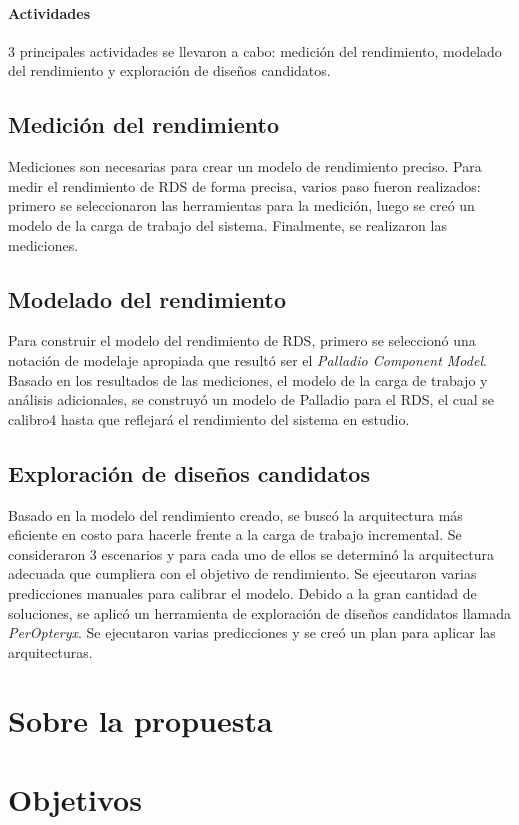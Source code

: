 \paragraph{Actividades} 3 principales actividades se llevaron a cabo: medición del rendimiento, modelado del rendimiento y exploración de diseños candidatos.

\subsection{Medición del rendimiento}
Mediciones son necesarias para crear un modelo de rendimiento preciso. Para medir el rendimiento de RDS de forma precisa, varios paso fueron realizados: primero se seleccionaron las herramientas para la medición, luego se creó un modelo de la carga de trabajo del sistema. Finalmente, se realizaron las mediciones.

\subsection{Modelado del rendimiento}
Para construir el modelo del rendimiento de RDS, primero se seleccionó una notación de modelaje apropiada que resultó ser el \emph{Palladio Component Model}. Basado en los resultados de las mediciones, el modelo de la carga de trabajo y análisis adicionales, se construyó un modelo de Palladio para el RDS, el cual se calibro4 hasta que reflejará el rendimiento del sistema en estudio.

\subsection{Exploración de diseños candidatos}
Basado en la modelo del rendimiento creado, se buscó la arquitectura más eficiente en costo para hacerle frente a la carga de trabajo incremental. Se consideraron 3 escenarios y para cada uno de ellos se determinó la arquitectura adecuada que cumpliera con el objetivo de rendimiento. Se ejecutaron varias predicciones manuales para calibrar el modelo. Debido a la gran cantidad de soluciones, se aplicó un herramienta de exploración de diseños candidatos llamada \emph{PerOpteryx}. Se ejecutaron varias predicciones y se creó un plan para aplicar las arquitecturas.


\newpage
\section{Sobre la propuesta}

\section{Objetivos}

